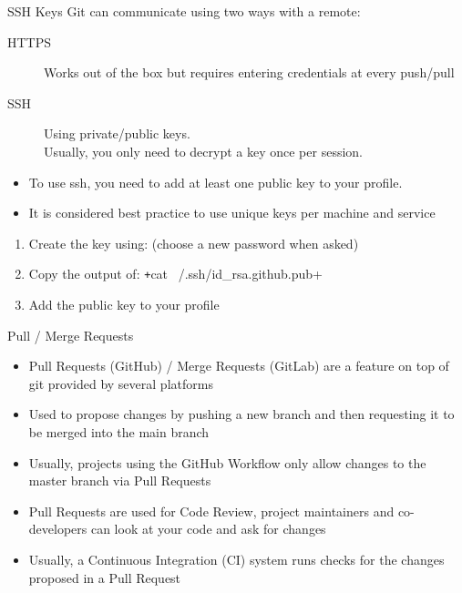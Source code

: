 \begin{frame}[fragile]{SSH Keys}
  Git can communicate using two ways with a remote:
  \begin{description}
    \item[HTTPS] Works out of the box but requires entering credentials at every push/pull
    \item[SSH] Using private/public keys. \\ Usually, you only need to decrypt a key once per session.
  \end{description}

  \begin{itemize}
    \item To use ssh, you need to add at least one public key to your profile. 
    \item It is considered best practice to use unique keys per machine and service
  \end{itemize}

  \begin{enumerate}
    \item Create the key using: (choose a new password when asked)
    \item Copy the output of: \texttt+cat ~/.ssh/id_rsa.github.pub+
    \item Add the public key to your profile
  \end{enumerate}
\end{frame}

\begin{frame}[c]{Pull / Merge Requests}
  \begin{itemize}
    \item Pull Requests (GitHub) / Merge Requests (GitLab) are a feature on top of git provided by several platforms
    \item Used to propose changes by pushing a new branch and then requesting it to be merged into the main branch
    \item Usually, projects using the GitHub Workflow only allow changes to the master branch via Pull Requests
    \item Pull Requests are used for Code Review, project maintainers and co-developers can look at your code and
      ask for changes
    \item Usually, a Continuous Integration (CI) system runs checks for the changes proposed in a Pull Request
  \end{itemize}
\end{frame}

